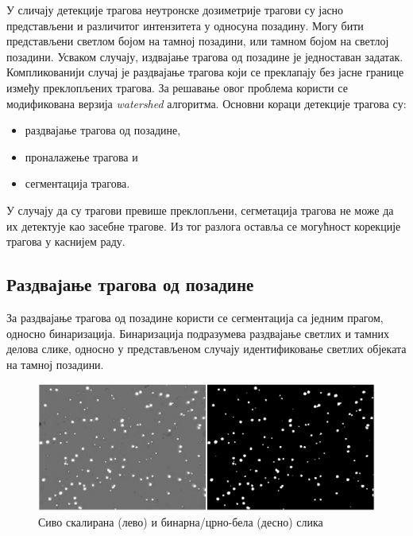 \documentclass[12pt,a4paper,serbian,oneside]{book}
\begin{document}
У сличају детекције трагова неутронске дозиметрије трагови су јасно представљени и различитог интензитета у односуна позадину. Могу бити представљени светлом бојом на тамној позадини, или тамном бојом на светлој позадини. Усваком случају, издвајање трагова од позадине је једноставан задатак. Компликованији случај је раздвајање трагова који се преклапају без јасне границе између преклопљених трагова. За решавање овог проблема користи се модификована верзија \textit{watershed} алгоритма. Основни кораци детекције трагова су:

\begin{itemize}
  \item раздвајање трагова од позадине,
  \item проналажење трагова и
  \item сегментација трагова.
\end{itemize}

У случају да су трагови превише преклопљени, сегметација трагова не може да их детектује као засебне трагове. Из тог разлога оставља се могућност корекције трагова у каснијем раду.

\subsection{Раздвајање трагова од позадине}

За раздвајање трагова од позадине користи се сегментација са једним прагом, односно бинаризација. Бинаризација подразумева раздвајање светлих и тамних делова слике, односно у представљеном случају идентификовање светлих објеката на тамној позадини.

\begin{figure}[htb]
\begin{center}
\leavevmode
\includegraphics[width=150mm]{images/binary.png}
\end{center}
\caption{Сиво скалирана (лево) и бинарна/црно-бела (десно) слика}
\label{fig:cv}
\end{figure}
\end{document}
